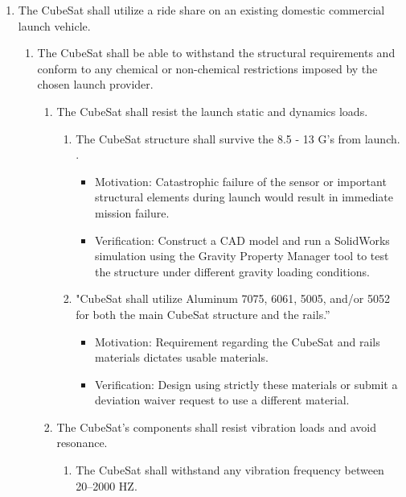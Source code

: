 \begin{enumerate}
\begin{enumerate}
    \end{enumerate} %
    \item The CubeSat shall utilize a ride share on an existing domestic commercial launch vehicle.
    \begin{enumerate}
        \item The CubeSat shall be able to withstand the structural requirements and conform to any chemical or non-chemical restrictions imposed by the chosen launch provider.  
        \begin{enumerate}
            \item The CubeSat shall resist the launch static and dynamics loads. 
            \begin{enumerate}
                \item The CubeSat structure shall survive the 8.5 - 13 G’s from launch. \cite{Falcon9}. 
                    \begin{itemize}
                        \item Motivation: Catastrophic failure of the sensor or important structural elements during launch would result in immediate mission failure.  
                        \item Verification: Construct a CAD model and run a SolidWorks simulation using the Gravity Property Manager tool to test the structure under different gravity loading conditions.
                    \end{itemize}
                \item "CubeSat shall utilize Aluminum 7075, 6061, 5005, and/or 5052 for both the main CubeSat structure and the rails.” \cite{CSS}
                    \begin{itemize}
                        \item Motivation: Requirement regarding the CubeSat and rails materials dictates usable materials.   
                        \item Verification: Design using strictly these materials or submit a deviation waiver request to use a different material. 
                    \end{itemize}
            \end{enumerate}
        \item The CubeSat’s components shall resist vibration loads and avoid resonance. 
        \begin{enumerate}
            \item The CubeSat shall withstand any vibration frequency between 20–2000 HZ\cite{FEA2, FEA3, FEA4}. 

\end{enumerate}
\end{enumerate}
\end{enumerate}
\end{enumerate}
